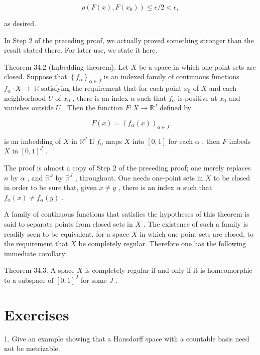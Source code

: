 \[
\rho \left( {F\left( x\right) ,F\left( {x}_{0}\right) }\right)  \leq  \epsilon /2 < \epsilon ,
\]

as desired.

In Step 2 of the preceding proof, we actually proved something stronger than the result stated there. For later use, we state it here.

Theorem 34.2 (Imbedding theorem). Let \(X\) be a space in which one-point sets are closed. Suppose that \({\left\{  {f}_{\alpha }\right\}  }_{\alpha  \in  J}\) is an indexed family of continuous functions \({f}_{\alpha } \cdot  X \rightarrow\)  \(\mathbb{R}\) satisfying the requirement that for each point \({x}_{0}\) of \(X\) and each neighborhood \(U\) of \({x}_{0}\) , there is an index \(\alpha\) such that \({f}_{\alpha }\) is positive at \({x}_{0}\) and vanishes outside \(U\) . Then the function \(F : X \rightarrow  {\mathbb{R}}^{J}\) defined by

\[
F\left( x\right)  = {\left( {f}_{\alpha }\left( x\right) \right) }_{\alpha  \in  J}
\]

is an imbedding of \(X\) in \({\mathbb{R}}^{J}\) If \({f}_{\alpha }\) maps \(X\) into \(\left\lbrack  {0,1}\right\rbrack\) for each \(\alpha\) , then \(F\) imbeds \(X\) in \({\left\lbrack  0,1\right\rbrack  }^{J}\) .

The proof is almost a copy of Step 2 of the preceding proof; one merely replaces \(n\) by \(\alpha\) , and \({\mathbb{R}}^{\omega }\) by \({\mathbb{R}}^{J}\) , throughout. One needs one-point sets in \(X\) to be closed in order to be sure that, given \(x \neq  y\) , there is an index \(\alpha\) such that \({f}_{\alpha }\left( x\right)  \neq  {f}_{\alpha }\left( y\right)\) .

A family of continuous functions that satisfies the hypotheses of this theorem is said to separate points from closed sets in \(X\) . The existence of such a family is readily seen to be equivalent, for a space \(X\) in which one-point sets are closed, to the requirement that \(X\) be completely regular. Therefore one has the following immediate corollary:

Theorem 34.3. A space \(X\) is completely regular if and only if it is homeomorphic to a subspace of \({\left\lbrack  0,1\right\rbrack  }^{J}\) for some \(J\) .

\section*{Exercises}

1. Give an example showing that a Hausdorff space with a countable basis need not be metrizable.

